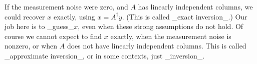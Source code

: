 If the measurement noise were zero, and \(A\) has linearly independent columns, we could recover \(x\) exactly, using \(x=A^{\dagger}y\). (This is called _exact inversion_.) Our job here is to _guess_\(x\), even when these strong assumptions do not hold. Of course we cannot expect to find \(x\) exactly, when the measurement noise is nonzero, or when \(A\) does not have linearly independent columns. This is called _approximate inversion_, or in some contexts, just _inversion_.

 